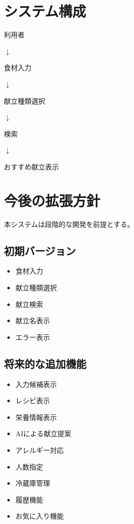 \documentclass[a4paper,12pt]{jarticle}
\begin{document}
\section{システム構成}

\begin{center}
利用者

$\downarrow$

食材入力

$\downarrow$

献立種類選択

$\downarrow$

検索

$\downarrow$

おすすめ献立表示
\end{center}

\section{今後の拡張方針}

本システムは段階的な開発を前提とする。

\subsection*{初期バージョン}

\begin{itemize}
    \item 食材入力
    \item 献立種類選択
    \item 献立検索
    \item 献立名表示
    \item エラー表示
\end{itemize}

\subsection*{将来的な追加機能}

\begin{itemize}
    \item 入力候補表示
    \item レシピ表示
    \item 栄養情報表示
    \item AIによる献立提案
    \item アレルギー対応
    \item 人数指定
    \item 冷蔵庫管理
    \item 履歴機能
    \item お気に入り機能
\end{itemize}
\end{document}
